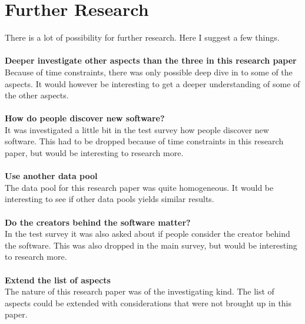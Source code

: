 \documentclass{cslthse-msc}
\begin{document}
    \chapter{Further Research}
    There is a lot of possibility for further research. Here I suggest a few things.\\\\
    \textbf{Deeper investigate other aspects than the three in this research paper}\\
    Because of time constraints, there was only possible deep dive in to some of the aspects. It would however be interesting to get a deeper understanding of some of the other aspects.\\\\
    \textbf{How do people discover new software?}\\
    It was investigated a little bit in the test survey how people discover new software. This had to be dropped because of time constraints in this research paper, but would be interesting to research more.\\\\
    \textbf{Use another data pool}\\
    The data pool for this research paper was quite homogeneous. It would be interesting to see if other data pools yields similar results.\\\\
    \textbf{Do the creators behind the software matter?}\\
    In the test survey it was also asked about if people consider the creator behind the software. This was also dropped in the main survey, but would be interesting to research more.\\\\
    \textbf{Extend the list of aspects}\\
    The nature of this research paper was of the investigating kind. The list of aspects could be extended with considerations that were not brought up in this paper.
    \newpage
    
    
\end{document}
